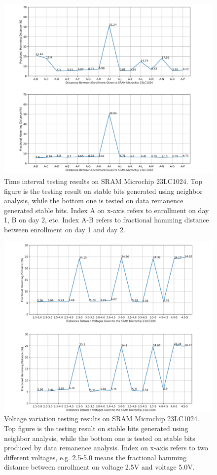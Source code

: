 \begin{figure}[tph!]
    \centerline{\includegraphics[width={1.1\textwidth}]{images/23lc1024_hd_intra_time_stable}}
    \caption{Time interval testing results on SRAM Microchip 23LC1024. Top figure is the testing result on stable bits generated using neighbor analysis, while the bottom one is tested on data remanence generated stable bits. Index A on x-axis refers to enrollment on day 1, B on day 2, etc. Index A-B refers to fractional hamming distance between enrollment on day 1 and day 2.}
    \label{fig:test_stable_23lc1024}
\end{figure}

\begin{figure}[tph!]
    \centerline{\includegraphics[width={1.1\textwidth}]{images/23lc1024_hd_intra_voltage_stable}}
    \caption{Voltage variation testing results on SRAM Microchip 23LC1024. Top figure is the testing result on stable bits generated using neighbor analysis, while the bottom one is tested on stable bits produced by data remanence analysis. Index on x-axis refers to two different voltages, e.g. 2.5-5.0 means the fractional hamming distance between enrollment on voltage 2.5V and voltage 5.0V.}
    \label{fig:test_stable_23lc1024_voltage}
\end{figure}

